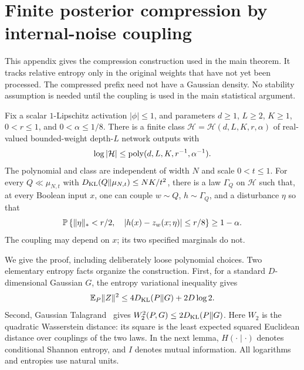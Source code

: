 \section{Finite posterior compression by internal-noise coupling}
\label{sec:robust-entropy}

This appendix gives the compression construction used in the main theorem.
It tracks relative entropy only in the original weights that have not yet
been processed. The compressed prefix need not have a Gaussian density.
No stability assumption is needed until the coupling is used in the main
statistical argument.

\begin{theorem}
\label{thm:robust-entropy}
Fix a scalar $1$-Lipschitz activation $|\phi|\le1$, and parameters
$d\ge1$, $L\ge2$, $K\ge1$, $0<r\le1$, and $0<\alpha\le1/8$.
There is a finite class $\mathcal H=\mathcal H(d,L,K,r,\alpha)$ of
real-valued bounded-weight depth-$L$ network outputs with
\[
 \log|\mathcal H|\le\operatorname{poly}(d,L,K,r^{-1},\alpha^{-1}).
\]
The polynomial and class are independent of width $N$ and scale $0<t\le1$.
For every $Q\ll\mu_{N,t}$ with
$D_{\rm KL}(Q\Vert\mu_{N,t})\le NK/t^2$, there is a law $\Gamma_Q$ on
$\mathcal H$ such that, at every Boolean input $x$, one can couple
$w\sim Q$, $h\sim\Gamma_Q$, and a disturbance $\eta$ so that
\[
 \mathbb P\left\{\|\eta\|_*<r/2,\quad
       |h(x)-z_w(x;\eta)|\le r/8\right\}\ge1-\alpha.
\]
The coupling may depend on $x$; its two specified marginals do not.
\end{theorem}

We give the proof, including deliberately loose polynomial choices.
Two elementary entropy facts organize the construction. First, for a standard
$D$-dimensional Gaussian $G$, the entropy variational inequality gives
\begin{equation}\label{eq:entropy-moment}
 \mathbb E_P\|Z\|^2\le4D_{\rm KL}(P\Vert G)+2D\log2.
\end{equation}
Second, Gaussian Talagrand~\cite{talagrand} gives
$W_2^2(P,G)\le2D_{\rm KL}(P\Vert G)$.
Here $W_2$ is the quadratic Wasserstein distance: its square is the
least expected squared Euclidean distance over couplings of the two
laws. In the next lemma, $H(\cdot\mid\cdot)$ denotes conditional
Shannon entropy, and $I$ denotes mutual information. All logarithms
and entropies use natural units.

